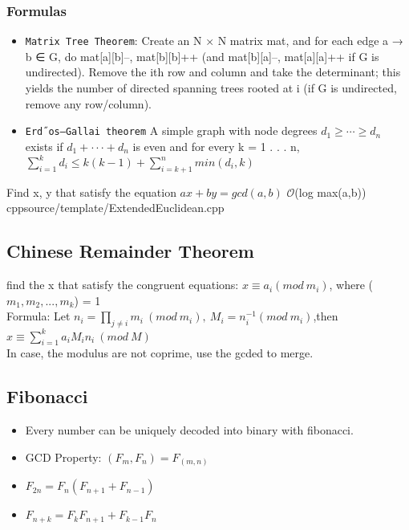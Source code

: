 \subsubsection{Formulas}
\begin{itemize}
    \item \texttt{Matrix Tree Theorem}: Create an N × N matrix mat, and for each edge a → b ∈ G, do mat[a][b]--, mat[b][b]++ (and mat[b][a]--, mat[a][a]++ if G is undirected). Remove the ith row and column and take the determinant; this yields the number of directed spanning trees rooted at i (if G is undirected, remove any row/column).
    \item \texttt{Erd˝os–Gallai theorem} A simple graph with node degrees $d_1 \geq \cdots \geq d_n$ exists if $d_1 + · · · + d_n$ is even and for every k = 1 . . . n, $\sum^k_{i=1}d_i ≤ k(k − 1) + \sum_{i=k+1}^nmin(d_i, k)$
\end{itemize}


{Find x, y that satisfy the equation $ax + by = gcd(a, b)$}
{$\mathcal{O}$(log max(a,b))}
{cpp}{source/template/ExtendedEuclidean.cpp}


\subsection{Chinese Remainder Theorem}
{find the x that satisfy the congruent equations: $x\equiv a_i(mod \ m_i)$}, where ($m_1, m_2,...,m_k$) = 1
\\ Formula: Let $n_i = \prod_{j\ne i}m_i \ (mod \ m_i), \ M_i = n_i^{-1}(mod \ m_i)$,then $x \equiv \sum_{i=1}^{k} a_i M_i n_i \ (mod \ M)$
\\ In case, the modulus are not coprime, use the gcded to merge.

\subsection{Fibonacci}
\begin{itemize}
\item Every number can be uniquely decoded into binary with fibonacci.
\item GCD Property: $(F_m, F_n) = F_{(m, n)} $
\item $F_{2n} = F_n (F_{n+1} + F_{n-1})$
\item $F_{n+k} = F_k F_{n+1} + F_{k-1} F_n$
\end{itemize}



